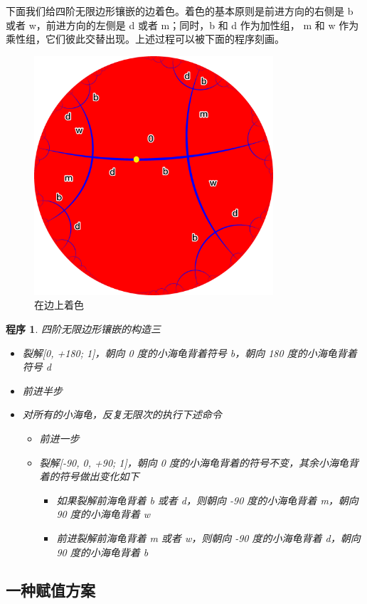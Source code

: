 \documentclass[a4paper,12pt]{article}
\newtheorem{program}{程序}
\begin{document}
下面我们给四阶无限边形镶嵌的边着色。着色的基本原则是前进方向的右侧是 b 或者 w，前进方向的左侧是 d 或者 m；同时，b 和 d 作为加性组，
m 和 w 作为乘性组，它们彼此交替出现。上述过程可以被下面的程序刻画。

\begin{figure}[ht]
\centering
\includegraphics[width=3.5in]{images/H2_tiling_with_color.png}
\caption{在边上着色}
\end{figure}

\begin{program}
四阶无限边形镶嵌的构造三
\begin{itemize}
\item 裂解[0, +180; 1]，朝向 0 度的小海龟背着符号 b，朝向 180 度的小海龟背着符号 d
\item 前进半步
\item 对所有的小海龟，反复无限次的执行下述命令
\begin{itemize}
  \item 前进一步
  \item 裂解[-90, 0, +90; 1]，朝向 0 度的小海龟背着的符号不变，其余小海龟背着的符号做出变化如下
    \begin{itemize}
      \item 如果裂解前海龟背着 b 或者 d，则朝向 -90 度的小海龟背着 m，朝向 90 度的小海龟背着 w
      \item 前进裂解前海龟背着 m 或者 w，则朝向 -90 度的小海龟背着 d，朝向 90 度的小海龟背着 b
    \end{itemize}
  \end{itemize}
\end{itemize}
\end{program}

\subsection{一种赋值方案}
\end{document}
